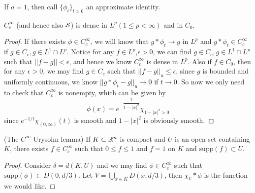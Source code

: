 \begin{definition}
    If $a=1$, then call $\{\phi_t\}_{t>0}$ an approximate identity.
\end{definition}

\begin{proposition}
    $C_c^{\infty}$ (and hence also $\mathcal{S}$) is dense in $L^p(1\leq p <\infty)$ and in $C_0$.
\end{proposition}
\begin{proof}\par
    If there exists $\phi\in C_c^{\infty}$, we will know that $g*\phi_t \to g$ in $L^p$ and $g*\phi_t \in C_c^{\infty}$ if $g\in C_c, g\in L^1\cap L^p$. Notice for any $f\in L^p$,$\epsilon > 0$, we can find $g\in C_c, g\in L^1\cap L^p$ such that $||f-g||<\epsilon$, and hence we know $C_c^{\infty}$ is dense in $L^p$. Also if $f\in C_0$, then for any $\epsilon > 0$, we may find $g\in C_c$ such that $||f-g||_u \leq \epsilon$, since $g$ is bounded and uniformly continuous, we know $||g*\phi_t - g||_u \to 0$ if $t\to 0$.
    So now we only need to check that $C_c^{\infty}$ is nonempty, which can be given by
    \[
    \phi(x) = e^{-\dfrac{1}{1-|x|^2}}\chi_{1-|x|^2 > 0}\]
    since $e^{-1/t}\chi_{(0,\infty)}(t)$ is smooth and $1-|x|^2$ is obviously smooth.
\end{proof}

\begin{theorem}
    (The $C^{\infty}$ Urysohn lemma) If $K\subset\mathbb{R}^n$ is compact and $U$ is an open set containing $K$, there exists $f\in C_c^{\infty}$ such that $0\leq f \leq 1$ and $f = 1$ on $K$ and $\text{supp}(f)\subset U$. 
\end{theorem}
\begin{proof}\par
    Consider $\delta = d(K,U)$ and we may find $\phi\in C_c^{\infty}$ such that $\text{supp}(\phi) \subset D(0,d/3)$. Let $V = \bigcup_{x\in K}D(x,d/3)$, then $\chi_V*\phi$ is the function we would like.
\end{proof}

